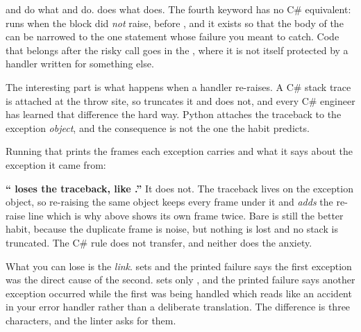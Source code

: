  and  do what  and  do.
 does what  does. The fourth keyword has no C\#
equivalent:  runs when the  block did \emph{not} raise,
before , and it exists so that the body of the  can
be narrowed to the one statement whose failure you meant to catch. Code that
belongs after the risky call goes in the , where it is not itself
protected by a handler written for something else.

The interesting part is what happens when a handler re-raises. A C\# stack
trace is attached at the throw site, so  truncates it and
 does not, and every C\# engineer has learned that difference
the hard way. Python attaches the traceback to the exception \emph{object},
and the consequence is not the one the habit predicts.


\noindent
Running that prints the frames each exception carries and what it says about
the exception it came from:


\begin{trapbox}
\textbf{\enquote{ loses the traceback, like .}}
It does not. The traceback lives on the exception object, so re-raising the
same object keeps every frame under it and \emph{adds} the re-raise line
\dash{} which is why  above shows its own frame twice. Bare
 is still the better habit, because the duplicate frame is
noise, but nothing is lost and no stack is truncated. The C\# rule does not
transfer, and neither does the anxiety.
\end{trapbox}

\noindent
What you can lose is the \emph{link}.  sets
 and the printed failure says the first exception was
the direct cause of the second.  sets only
, and the printed failure says another exception
occurred while the first was being handled \dash{} which reads like an
accident in your error handler rather than a deliberate translation. The
difference is three characters, and the linter asks for them.


